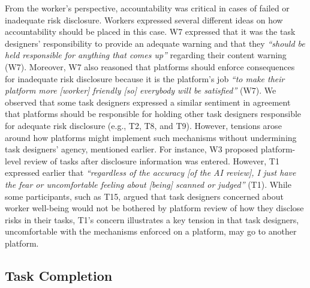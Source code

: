From the worker's perspective, accountability was critical in cases of failed or inadequate risk disclosure. Workers expressed several different ideas on how accountability should be placed in this case. W7 expressed that it was the task designers' responsibility to provide an adequate warning and that they \textit{``should be held responsible for anything that comes up''} regarding their content warning (W7). Moreover, W7 also reasoned that platforms should enforce consequences for inadequate risk disclosure because it is the platform's job \textit{``to make their platform more [worker] friendly [so] everybody will be satisfied''} (W7). We observed that some task designers expressed a similar sentiment in agreement that platforms should be responsible for holding other task designers responsible for adequate risk disclosure (e.g., T2, T8, and T9). However, tensions arose around how platforms might implement such mechanisms without undermining task designers' agency, mentioned earlier. For instance, W3 proposed platform-level review of tasks after disclosure information was entered. However, T1 expressed earlier that \textit{``regardless of the accuracy [of the AI review], I just have the fear or uncomfortable feeling about [being] scanned or judged''} (T1). While some participants, such as T15, argued that task designers concerned about worker well-being would not be bothered by platform review of how they disclose risks in their tasks, T1's concern illustrates a key tension in that task designers, uncomfortable with the mechanisms enforced on a platform, may go to another platform. 

\subsection{Task Completion}

